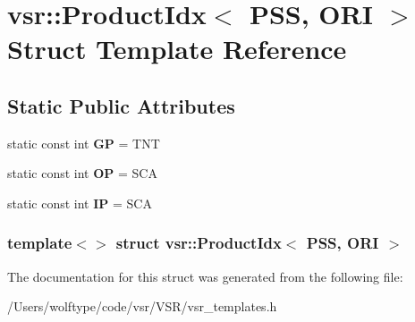 \hypertarget{structvsr_1_1_product_idx_3_01_p_s_s_00_01_o_r_i_01_4}{\section{vsr\-:\-:Product\-Idx$<$ P\-S\-S, O\-R\-I $>$ Struct Template Reference}
\label{structvsr_1_1_product_idx_3_01_p_s_s_00_01_o_r_i_01_4}
}
\subsection*{Static Public Attributes}
\begin{DoxyCompactItemize}
\item 
\hypertarget{structvsr_1_1_product_idx_3_01_p_s_s_00_01_o_r_i_01_4_aafcc46a0f2eea64d9227890e24f48f11}{static const int {\bfseries G\-P} = T\-N\-T}\label{structvsr_1_1_product_idx_3_01_p_s_s_00_01_o_r_i_01_4_aafcc46a0f2eea64d9227890e24f48f11}

\item 
\hypertarget{structvsr_1_1_product_idx_3_01_p_s_s_00_01_o_r_i_01_4_a8d0727ae8581b4d7d1298baee4bf7251}{static const int {\bfseries O\-P} = S\-C\-A}\label{structvsr_1_1_product_idx_3_01_p_s_s_00_01_o_r_i_01_4_a8d0727ae8581b4d7d1298baee4bf7251}

\item 
\hypertarget{structvsr_1_1_product_idx_3_01_p_s_s_00_01_o_r_i_01_4_a72e662462a85bed5641cef9e231aed7e}{static const int {\bfseries I\-P} = S\-C\-A}\label{structvsr_1_1_product_idx_3_01_p_s_s_00_01_o_r_i_01_4_a72e662462a85bed5641cef9e231aed7e}

\end{DoxyCompactItemize}
\subsubsection*{template$<$$>$ struct vsr\-::\-Product\-Idx$<$ P\-S\-S, O\-R\-I $>$}



The documentation for this struct was generated from the following file\-:\begin{DoxyCompactItemize}
\item 
/\-Users/wolftype/code/vsr/\-V\-S\-R/vsr\-\_\-templates.\-h\end{DoxyCompactItemize}
